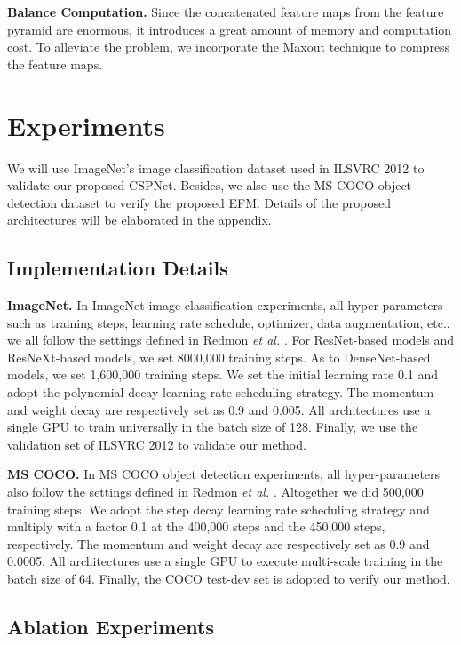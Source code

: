 \documentclass{article}
\begin{document}
{\bf Balance Computation.} Since the concatenated feature maps from the feature pyramid are enormous, it introduces a great amount of memory and computation cost. To alleviate the problem, we incorporate the Maxout technique to compress the feature maps.

\section{Experiments}


We will use ImageNet's image classification dataset \cite{deng2009imagenet} used in ILSVRC 2012 to validate our proposed CSPNet.  Besides, we also use the MS COCO object detection dataset \cite{lin2014microsoft} to verify the proposed EFM.  Details of the proposed architectures will be elaborated in the appendix.

\subsection{Implementation Details}

{\bf ImageNet.} In ImageNet image classification experiments, all hyper-parameters such as training steps, learning rate schedule, optimizer, data augmentation, etc., we all follow the settings defined in Redmon \textit{et al.} \cite{redmon2018yolov3}.  For ResNet-based models and ResNeXt-based models, we set 8000,000 training steps.  As to DenseNet-based models, we set 1,600,000 training steps.  We set the initial learning rate 0.1 and adopt the polynomial decay learning rate scheduling strategy.  The momentum and weight decay are respectively set as 0.9 and 0.005.  All architectures use a single GPU to train universally in the batch size of 128.  Finally, we use the validation set of ILSVRC 2012 to validate our method.  

{\bf MS COCO.} In MS COCO object detection experiments, all hyper-parameters also follow the settings defined in Redmon \textit{et al.} \cite{redmon2018yolov3}.  Altogether we did 500,000 training steps.  We adopt the step decay learning rate scheduling strategy and multiply with a factor 0.1 at the 400,000 steps and the 450,000 steps, respectively.  The momentum and weight decay are respectively set as 0.9 and 0.0005.  All architectures use a single GPU to execute multi-scale training in the batch size of 64.  Finally, the COCO test-dev set is adopted to verify our method.

\subsection{Ablation Experiments}
\end{document}
